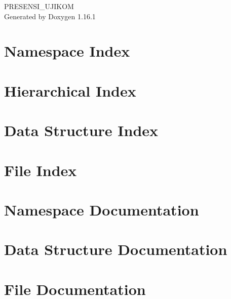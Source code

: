 \documentclass[twoside]{book}
\newcommand{\+}{\discretionary{\mbox{\scriptsize$\hookleftarrow$}}{}{}}
\newcommand{\clearemptydoublepage}{%
    \newpage{\pagestyle{empty}\cleardoublepage}%
  }
\begin{document}
  \raggedbottom
    \hypersetup{pageanchor=false,
                bookmarksnumbered=true,
                pdfencoding=unicode
               }
  \begin{titlepage}
  \vspace*{7cm}
  \begin{center}%
  {\Large PRESENSI\+\_\+\+UJIKOM}\\
  \vspace*{1cm}
  {\large Generated by Doxygen 1.16.1}\\
  \end{center}
  \end{titlepage}
  \clearemptydoublepage
  \tableofcontents
  \clearemptydoublepage
  \hypersetup{pageanchor=true}
\chapter{Namespace Index}

\chapter{Hierarchical Index}

\chapter{Data Structure Index}

\chapter{File Index}

\chapter{Namespace Documentation}

\chapter{Data Structure Documentation}






\chapter{File Documentation}






  \backmatter
  \newpage
  \clearemptydoublepage
  \printindex
\end{document}
